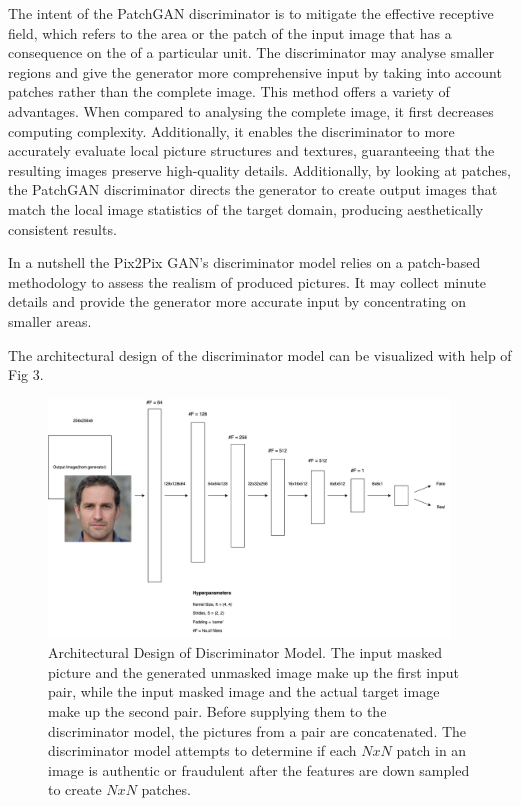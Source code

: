 \documentclass{./styles/svproc}
\begin{document}
The intent of the PatchGAN discriminator is to mitigate the effective receptive field, which refers to the area or the patch of the input image that has a consequence on the of a particular unit. The discriminator may analyse smaller regions and give the generator more comprehensive input by taking into account patches rather than the complete image. This method offers a variety of advantages. When compared to analysing the complete image, it first decreases computing complexity. Additionally, it enables the discriminator to more accurately evaluate local picture structures and textures, guaranteeing that the resulting images preserve high-quality details. Additionally, by looking at patches, the PatchGAN discriminator directs the generator to create output images that match the local image statistics of the target domain, producing aesthetically consistent results.

In a nutshell the Pix2Pix GAN's discriminator model relies on a patch-based methodology to assess the realism of produced pictures. It may collect minute details and provide the generator more accurate input by concentrating on smaller areas.

The architectural design of the discriminator model can be visualized with help of Fig 3.

\begin{figure}[ht]%
\centering
\includegraphics[width=0.95\textwidth]{figures/discriminator.png}
\caption{Architectural Design of Discriminator Model. The input masked picture and the generated unmasked image make up the first input pair, while the input masked image and the actual target image make up the second pair. Before supplying them to the discriminator model, the pictures from a pair are concatenated. The discriminator model attempts to determine if each $NxN$ patch in an image is authentic or fraudulent after the features are down sampled to create $NxN$ patches.}\label{fig3}
\end{figure}
\end{document}
